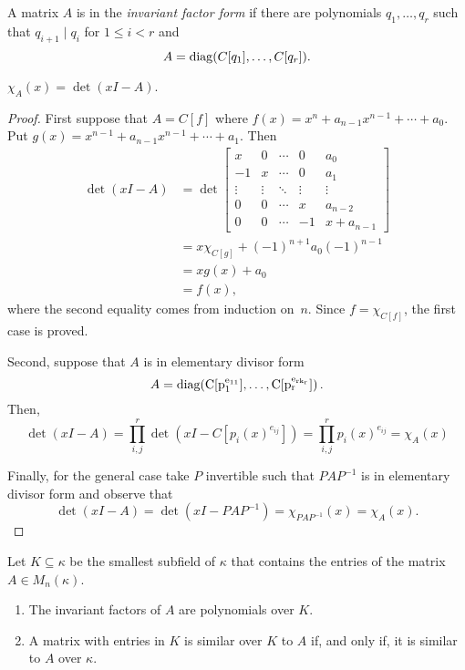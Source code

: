 \begin{defn}
    A matrix $A$ is in the \textsl{invariant factor form} if there are polynomials $q_1,\dots,q_r$ such that $q_{i+1}\mid q_i$ for $1\le i<r$ and
    $$
        A = \operatorname{diag}(C[q_1],\dots,C[q_r]).
    $$
\end{defn}

\begin{thm}
    $\chi_A(x)=\det(xI-A)$.
\end{thm}

\begin{proof}
    First suppose that $A=C[f]$ where $f(x)=x^n+a_{n-1}x^{n-1}+\cdots+a_0$. Put $g(x)=x^{n-1}+a_{n-1}x^{n-1}+\cdots+a_1$. Then
    \begin{align*}
        \det(xI-A) & = \det
            \begin{bmatrix}
                x & 0 & \cdots & 0 & a_0 \\
                -1 & x & \cdots & 0 & a_1 \\
                \vdots&\vdots&\ddots&\vdots&\vdots\\
                0 & 0 & \cdots & x & a_{n-2} \\
                0 & 0 & \cdots & -1 & x + a_{n-1}
            \end{bmatrix}\\
            &=x\chi_{C[g]}+(-1)^{n+1}a_0(-1)^{n-1}\\
            &= xg(x)+a_0\\
            &= f(x),
    \end{align*}
    where the second equality comes from induction on~$n$. Since $f=\chi_{C[f]}$, the first case is proved.

    Second, suppose that $A$ is in elementary divisor form
    $$
        A = \operatorname{diag(C[p_1^{e_{11}}],\dots,C[p_r^{e_{rk_r}}])}.
    $$
    Then,
    $$
        \det(xI-A) = \prod_{i,j}^r\det(xI-C[p_i(x)^{e_{ij}}])
            = \prod_{i,j}^rp_i(x)^{e_{ij}} = \chi_A(x)
    $$

    Finally, for the general case take $P$ invertible such that $PAP^{-1}$ is in elementary divisor form and observe that
    $$
        \det(xI-A) = \det(xI-PAP^{-1})=\chi_{PAP^{-1}}(x)=\chi_A(x).
    $$
\end{proof}

\begin{thm}\label{thm:subfield-similarity}
    Let\/ $K\subseteq\kappa$ be the smallest subfield of\/ $\kappa$ that contains the entries of the matrix\/~$A\in M_n(\kappa)$.
    \begin{enumerate}[\rm a)]
      \item The invariant factors of\/ $A$ are polynomials over\/ $K$.
      \item A matrix with entries in\/ $K$ is similar over\/ $K$ to\/ $A$ if, and only if, it is similar to\/ $A$ over\/ $\kappa$.
    \end{enumerate}
\end{thm}


